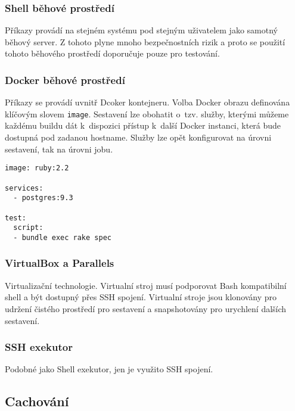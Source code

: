 \subsubsection{Shell běhové prostředí}

Příkazy provádí na stejném systému pod stejným uživatelem jako samotný běhový server.
Z tohoto plyne mnoho bezpečnostních rizik a proto se použití tohoto běhového prostředí doporučuje pouze pro testování.

\subsubsection{Docker běhové prostředí}

Příkazy se provádí uvnitř Dcoker kontejneru.
Volba Docker obrazu definována klíčovým slovem \verb|image|.
Sestavení lze obohatit o~tzv. služby, kterými můžeme každému buildu dát k~dispozici přístup k~další Docker instanci, která bude dostupná pod zadanou hostname.
Služby lze opět konfigurovat na úrovni sestavení, tak na úrovni jobu.

\begin{verbatim}
image: ruby:2.2

services:
  - postgres:9.3

test:
  script:
  - bundle exec rake spec
\end{verbatim}

\subsubsection{VirtualBox a Parallels}

Virtualizační technologie.
Virtualní stroj musí podporovat Bash kompatibilní shell a být dostupný přes SSH spojení.
Virtualní stroje jsou klonovány pro udržení čistého prostředí pro sestavení a snapshotovány pro urychlení dalších sestavení.


\subsubsection{SSH exekutor}

Podobné jako Shell exekutor, jen je využito SSH spojení.

\subsection{Cachování}


